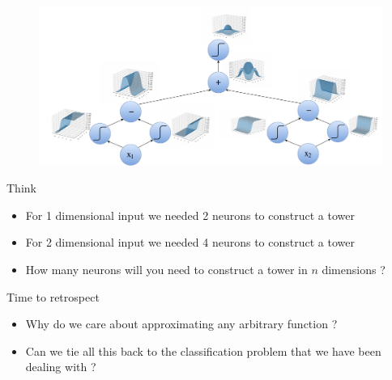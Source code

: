 \begin{frame}
	\begin{figure}
		\includegraphics[scale=0.3]{images/module5/Plots/nn_g}
	\end{figure}
\end{frame}


\begin{frame}
	\begin{block}{Think}
		\begin{itemize}\justifying
			\item For 1 dimensional input we needed 2 neurons to construct a tower
			\item For 2 dimensional input we needed 4 neurons to construct a tower
			\item How many neurons will you need to construct a tower in $n$ dimensions ?
		\end{itemize}
	\end{block}
\end{frame}

\begin{frame}
	\begin{block}{Time to retrospect}
		\begin{itemize}\justifying
			\item Why do we care about approximating any arbitrary function ?
			\item Can we tie all this back to the classification problem that we have been dealing with ?
		\end{itemize}
	\end{block}
\end{frame}


